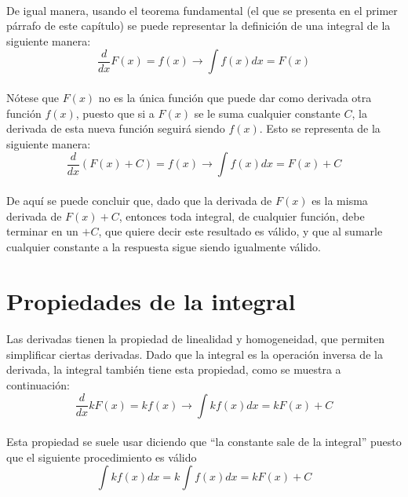 \documentclass{book}
\begin{document}
        \paragraph{}De igual manera, usando el teorema fundamental (el que se presenta en el primer párrafo de este capítulo) se puede representar la definición de una integral de la siguiente manera:
        \begin{equation}
        \frac{d}{dx}F(x) = f(x)\rightarrow\int{f(x)}dx=F(x)
        \end{equation}
        \paragraph{}Nótese que $F(x)$ no es la única función que puede dar como derivada otra función $f(x)$, puesto que si a $F(x)$ se le suma cualquier constante $C$, la derivada de esta nueva función seguirá siendo $f(x)$. Esto se representa de la siguiente manera:
        \begin{equation}
        \frac{d}{dx}\left(F(x)+C\right) = f(x)\rightarrow\int{f(x)}dx=F(x)+C
        \end{equation}
        \paragraph{}De aquí se puede concluir que, dado que la derivada de $F(x)$ es la misma derivada de $F(x)+C$, entonces toda integral, de cualquier función, debe terminar en un $+C$, que quiere decir este resultado es válido, y que al sumarle cualquier constante a la respuesta sigue siendo igualmente válido.
        \section{Propiedades de la integral}
            \paragraph{}Las derivadas tienen la propiedad de linealidad y homogeneidad, que permiten simplificar ciertas derivadas. Dado que la integral es la operación inversa de la derivada, la integral también tiene esta propiedad, como se muestra a continuación:
            \begin{equation}
            \frac{d}{dx}kF(x) = kf(x)\rightarrow\int{kf(x)}dx=kF(x)+C
            \end{equation}
            \paragraph{}Esta propiedad se suele usar diciendo que ``la constante sale de la integral'' puesto que el siguiente procedimiento es válido
            \begin{equation}
            \int{kf(x)}dx=k\int{f(x)}dx=kF(x)+C
            \end{equation}
\end{document}
